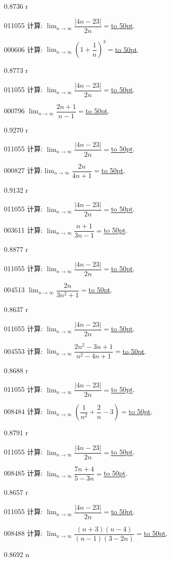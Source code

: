 \documentclass[10pt,a4paper]{article}
\newcommand{\blank}[1]{\underline{\hbox to #1pt{}}}
\begin{document}
0.8736 r

011055	计算: $\displaystyle\lim_{n\to \infty} \dfrac{|4n-23|}{2n}=$\blank{50}.

000606	计算: $\displaystyle\lim_{n\to\infty}(1+\dfrac1n)^3=$\blank{50}.

0.8773 r

011055	计算: $\displaystyle\lim_{n\to \infty} \dfrac{|4n-23|}{2n}=$\blank{50}.

000796	$\displaystyle\lim_{n\to \infty}\dfrac{2n+1}{n-1}=$\blank{50}.

0.9270 r

011055	计算: $\displaystyle\lim_{n\to \infty} \dfrac{|4n-23|}{2n}=$\blank{50}.

000827	计算:$\displaystyle\lim_{n\to\infty}\dfrac{2n}{4n+1}=$\blank{50}.

0.9132 r

011055	计算: $\displaystyle\lim_{n\to \infty} \dfrac{|4n-23|}{2n}=$\blank{50}.

003611	计算: $\displaystyle\lim_{n\to\infty}\dfrac{n+1}{3n-1}=$\blank{50}.

0.8877 r

011055	计算: $\displaystyle\lim_{n\to \infty} \dfrac{|4n-23|}{2n}=$\blank{50}.

004513	$\displaystyle\lim_{n\to \infty}\dfrac{2n}{3{n^2}+1}=$\blank{50}.

0.8637 r

011055	计算: $\displaystyle\lim_{n\to \infty} \dfrac{|4n-23|}{2n}=$\blank{50}.

004553	计算: $\displaystyle\lim_{n\to\infty}\dfrac{2n^2-3n+1}{n^2-4n+1}=$\blank{50}.

0.8688 r

011055	计算: $\displaystyle\lim_{n\to \infty} \dfrac{|4n-23|}{2n}=$\blank{50}.

008484	计算: $\displaystyle\lim_{n\to\infty}(\dfrac 1{n^2}+\dfrac 2n-3)=$\blank{50}.

0.8791 r

011055	计算: $\displaystyle\lim_{n\to \infty} \dfrac{|4n-23|}{2n}=$\blank{50}.

008485	计算: $\displaystyle\lim_{n\to\infty}\dfrac{7n+4}{5-3n}=$\blank{50}.

0.8657 r

011055	计算: $\displaystyle\lim_{n\to \infty} \dfrac{|4n-23|}{2n}=$\blank{50}.

008488	计算: $\displaystyle\lim_{n\to\infty}\dfrac{(n+3)(n-4)}{(n-1)(3-2n)}=$\blank{50}.

0.8692 n
\end{document}
